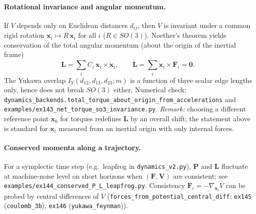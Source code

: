 \paragraph{Rotational invariance and angular momentum.}
If $V$ depends only on Euclidean distances $d_{ij}$, then $V$ is invariant under
a common rigid rotation $\mathbf{x}_i\mapsto R\,\mathbf{x}_i$ for all $i$
($R\in SO(3)$).  Noether's theorem yields conservation of the total angular
momentum (about the origin of the inertial frame)
\begin{equation}
  \mathbf{L}=\sum_i C_i\,\mathbf{x}_i\times\dot{\mathbf{x}}_i,
  \qquad
  \dot{\mathbf{L}}=\sum_i \mathbf{x}_i\times\mathbf{F}_i=\mathbf{0}.
\end{equation}
The Yukawa overlap $I_Y(d_{12},d_{13},d_{23};m)$ is a function of three scalar
edge lengths only, hence does not break $SO(3)$ either.  Numerical check:
\texttt{dynamics\_backends.total\_torque\_about\_origin\_from\_accelerations}
and \texttt{examples/ex143\_net\_torque\_so3\_invariance.py}.
\emph{Remark:} choosing a different reference point $\mathbf{x}_0$ for torques
redefines $\mathbf{L}$ by an overall shift; the statement above is standard for
$\mathbf{x}_i$ measured from an inertial origin with only internal forces.

\paragraph{Conserved momenta along a trajectory.}
For a symplectic time step (e.g.\ leapfrog in \texttt{dynamics\_v2.py}), $\mathbf{P}$
and $\mathbf{L}$ fluctuate at machine-noise level on short horizons when
$(\mathbf{F},\mathbf{V})$ are consistent; see
\texttt{examples/ex144\_conserved\_P\_L\_leapfrog.py}.
Consistency $\mathbf{F}_i=-\nabla_{\mathbf{x}_i}V$ can be probed by central
differences of $V$ (\texttt{forces\_from\_potential\_central\_diff};
\texttt{ex145} (\texttt{coulomb\_3b}), \texttt{ex146} (\texttt{yukawa\_feynman})).

